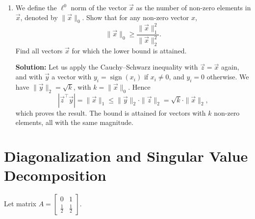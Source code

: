 \documentclass[10pt]{article}
\theoremstyle{definition}
\theoremstyle{plain}
\DeclareMathOperator{\sign}{sign}
\begin{document}
\begin{enumerate}[label=(\alph*)]
Finally, $\sqrt{n}\, \|\vec{x}\|_2 \leq n\, \|\vec{x}\|_\infty$ is achieved by an algebraic manipulation of the first derived bound using the fact that $\sqrt{n} = \frac{n}{\sqrt{n}}$.

\item We define the $\ell^0$ norm of the vector $\vec{x}$ as the number of non-zero elements in $\vec{x}$, denoted by $\|\vec{x}\|_0$. Show that for any non-zero vector $x$,
\begin{equation}
\|\vec{x}\|_0 \geq \frac{\|\vec{x}\|_1^2}{\|\vec{x}\|_2^2}.
\end{equation}
Find all vectors $\vec{x}$ for which the lower bound is attained.

\textbf{Solution:} Let us apply the Cauchy--Schwarz inequality with $\vec{z} = \vec{x}$ again, and with $\vec{y}$ a vector with $y_i = \sign(x_i)$ if $x_i \neq 0$, and $y_i = 0$ otherwise. We have $\|\vec{y}\|_2 = \sqrt{k}$, with $k = \|\vec{x}\|_0$. Hence
\begin{equation}
\left| \vec{z}^\top \vec{y} \right| = \|\vec{x}\|_1 \leq \|\vec{y}\|_2 \cdot \|\vec{z}\|_2 = \sqrt{k} \cdot \|\vec{x}\|_2,
\end{equation}
which proves the result. The bound is attained for vectors with $k$ non-zero elements, all with the same magnitude.
\end{enumerate}

\section{Diagonalization and Singular Value Decomposition}

Let matrix $A = \begin{bmatrix} 0 & 1 \\ \frac{1}{2} & \frac{1}{2} \end{bmatrix}$.
\end{document}
